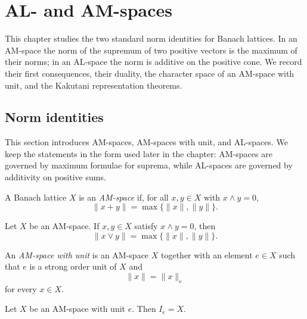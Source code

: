 \chapter{AL- and AM-spaces}

This chapter studies the two standard norm identities for Banach
lattices. In an AM-space the norm of the supremum of two positive
vectors is the maximum of their norms; in an AL-space the norm is
additive on the positive cone. We record their first consequences,
their duality, the character space of an AM-space with unit, and
the Kakutani representation theorems.

\section{Norm identities}

This section introduces AM-spaces, AM-spaces with unit, and
AL-spaces. We keep the statements in the form used later in the
chapter: AM-spaces are governed by maximum formulae for suprema,
while AL-spaces are governed by additivity on positive sums.

\begin{definition}
\label{def:am-space}
\leanok
{}
A Banach lattice $X$ is an \emph{AM-space} if, for all $x, y \in X$
with $x \wedge y = 0$,
\[
  \lVert x + y\rVert = \max\{\lVert x\rVert,\lVert y\rVert\}.
\]
\end{definition}

\begin{lemma}
\label{lem:amSpace-norm-sup-eq-max-of-inf-eq-zero}
\leanok
{}
Let $X$ be an AM-space. If $x, y \in X$ satisfy $x \wedge y = 0$,
then
\[
  \lVert x \vee y\rVert = \max\{\lVert x\rVert,\lVert y\rVert\}.
\]
\end{lemma}

\begin{definition}
\label{def:am-space-with-unit}
\leanok
{}
An \emph{AM-space with unit} is an AM-space $X$ together with an
element $e \in X$ such that $e$ is a strong order unit of $X$ and
\[
  \lVert x\rVert = \lVert x\rVert_e
\]
for every $x \in X$.
\end{definition}

\begin{lemma}
\label{lem:amSpaceWithUnit-principal-unit-eq-top}
\leanok
{}
Let $X$ be an AM-space with unit $e$. Then $I_e = X$.
\end{lemma}

